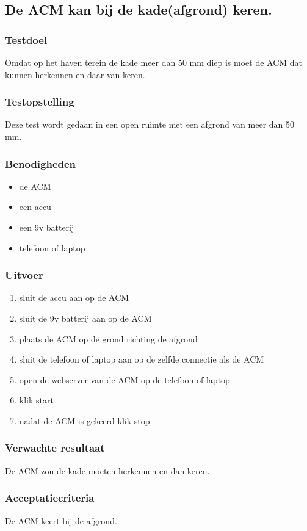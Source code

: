 \subsection{De ACM kan bij de kade(afgrond) keren.}
\subsubsection{Testdoel}
\begin{flushleft}
    Omdat op het haven terein de kade meer dan 50 mm diep is moet de ACM dat kunnen herkennen en daar van keren.
\end{flushleft}
\subsubsection{Testopstelling}
\begin{flushleft}
    Deze test wordt gedaan in een open ruimte met een afgrond van meer dan 50 mm.
\end{flushleft}
\subsubsection{Benodigheden}

\begin{itemize}
    \item de ACM
    \item een accu
    \item een 9v batterij
    \item telefoon of laptop
\end{itemize}
\subsubsection{Uitvoer}
\begin{enumerate}
    \item sluit de accu aan op de ACM
    \item sluit de 9v batterij aan op de ACM
    \item plaats de ACM op de grond richting de afgrond
    \item sluit de telefoon of laptop aan op de zelfde connectie als de ACM
    \item open de webserver van de ACM op de telefoon of laptop
    \item klik start
    \item nadat de ACM is gekeerd klik stop
\end{enumerate}
\subsubsection{Verwachte resultaat}
\begin{flushleft}
    De ACM zou de kade moeten herkennen en dan keren.
\end{flushleft}
\subsubsection{Acceptatiecriteria}
\begin{flushleft}
    De ACM keert bij de afgrond.
\end{flushleft}